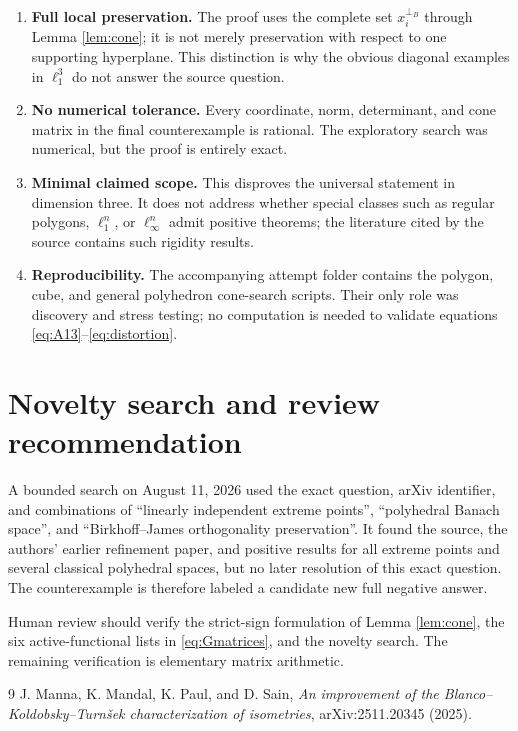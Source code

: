 \documentclass[11pt]{article}
\begin{document}
\begin{enumerate}[leftmargin=*]
\item \textbf{Full local preservation.} The proof uses the complete set
  $x_i^{\perp_B}$ through Lemma \ref{lem:cone}; it is not merely preservation
  with respect to one supporting hyperplane. This distinction is why the
  obvious diagonal examples in $\ell_1^3$ do not answer the source question.

\item \textbf{No numerical tolerance.} Every coordinate, norm, determinant,
  and cone matrix in the final counterexample is rational. The exploratory
  search was numerical, but the proof is entirely exact.

\item \textbf{Minimal claimed scope.} This disproves the universal statement
  in dimension three. It does not address whether special classes such as
  regular polygons, $\ell_1^n$, or $\ell_\infty^n$ admit positive theorems;
  the literature cited by the source contains such rigidity results.

\item \textbf{Reproducibility.} The accompanying attempt folder contains the
  polygon, cube, and general polyhedron cone-search scripts. Their only role
  was discovery and stress testing; no computation is needed to validate
  equations \eqref{eq:A13}--\eqref{eq:distortion}.
\end{enumerate}

\section{Novelty search and review recommendation}

A bounded search on August 11, 2026 used the exact question, arXiv identifier,
and combinations of ``linearly independent extreme points'', ``polyhedral
Banach space'', and ``Birkhoff--James orthogonality preservation''. It found
the source, the authors' earlier refinement paper, and positive results for
all extreme points and several classical polyhedral spaces, but no later
resolution of this exact question. The counterexample is therefore labeled a
candidate new full negative answer.

Human review should verify the strict-sign formulation of Lemma
\ref{lem:cone}, the six active-functional lists in \eqref{eq:Gmatrices}, and
the novelty search. The remaining verification is elementary matrix
arithmetic.

\begin{thebibliography}{9}
J. Manna, K. Mandal, K. Paul, and D. Sain,
\emph{An improvement of the Blanco--Koldobsky--Turn\v{s}ek characterization
of isometries}, arXiv:2511.20345 (2025).
\end{thebibliography}
\end{document}
